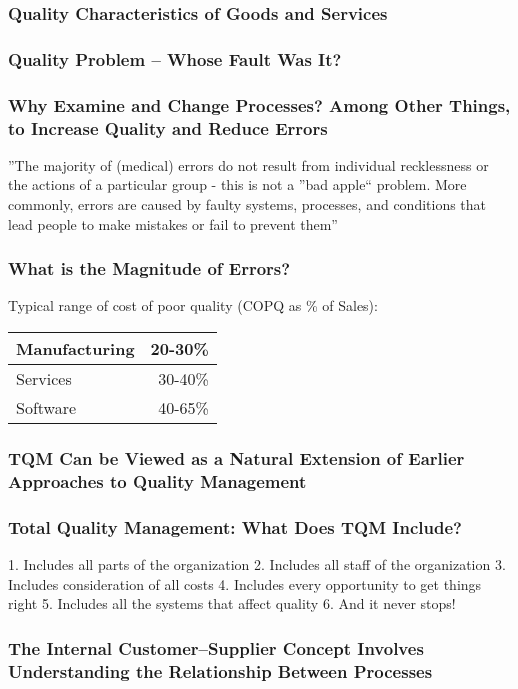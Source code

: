 \subsubsection{Quality Characteristics of Goods and Services}
\subsubsection{Quality Problem – Whose Fault Was It? }
\subsubsection{Why Examine and Change Processes? Among Other Things, to Increase Quality and Reduce Errors}
''The majority of (medical) errors do not result from
individual recklessness or the actions of a particular
group - this is not a ''bad apple`` problem.
More commonly, errors are caused by faulty systems,
processes, and conditions that lead people to make
mistakes or fail to prevent them''
\subsubsection{What is the Magnitude of Errors? }
Typical range of cost of poor quality
(COPQ as \% of Sales):\\
\begin{center}
\begin{tabular}{|l|r|}
	\hline Manufacturing & 20-30\% \\ 
	\hline Services & 30-40\% \\ 
	\hline Software & 40-65\% \\ 
	\hline 
\end{tabular} 
\end{center}
\subsubsection{TQM Can be Viewed as a Natural Extension of Earlier Approaches to Quality Management}
\subsubsection{Total Quality Management: What Does TQM Include?}
1. Includes all parts of the organization
2. Includes all staff of the organization
3. Includes consideration of all costs
4. Includes every opportunity to get things right
5. Includes all the systems that affect quality
6. And it never stops!
\subsubsection{The Internal Customer–Supplier Concept Involves Understanding the Relationship Between Processes}
